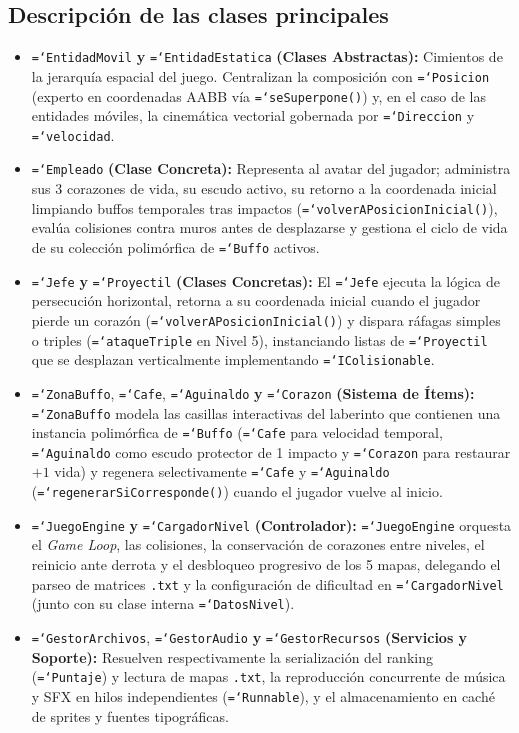 \documentclass[12pt, a4paper]{article}
\DeclareRobustCommand{\code}[1]{\textcolor{codegreen}{\texttt{\hyphenchar\font=`\-#1}}}
\begin{document}
\subsection{Descripción de las clases principales}
\begin{itemize}[leftmargin=1.27cm, before=]
    \item \code{EntidadMovil} \textbf{y} \code{EntidadEstatica} \textbf{(Clases Abstractas):} Cimientos de la jerarquía espacial del juego. Centralizan la composición con \code{Posicion} (experto en coordenadas AABB vía \code{seSuperpone()}) y, en el caso de las entidades móviles, la cinemática vectorial gobernada por \code{Direccion} y \code{velocidad}.
    \item \code{Empleado} \textbf{(Clase Concreta):} Representa al avatar del jugador; administra sus 3 corazones de vida, su escudo activo, su retorno a la coordenada inicial limpiando buffos temporales tras impactos (\code{volverAPosicionInicial()}), evalúa colisiones contra muros antes de desplazarse y gestiona el ciclo de vida de su colección polimórfica de \code{Buffo} activos.
    \item \code{Jefe} \textbf{y} \code{Proyectil} \textbf{(Clases Concretas):} El \code{Jefe} ejecuta la lógica de persecución horizontal, retorna a su coordenada inicial cuando el jugador pierde un corazón (\code{volverAPosicionInicial()}) y dispara ráfagas simples o triples (\code{ataqueTriple} en Nivel 5), instanciando listas de \code{Proyectil} que se desplazan verticalmente implementando \code{IColisionable}.
    \item \code{ZonaBuffo}, \code{Cafe}, \code{Aguinaldo} \textbf{y} \code{Corazon} \textbf{(Sistema de Ítems):} \code{ZonaBuffo} modela las casillas interactivas del laberinto que contienen una instancia polimórfica de \code{Buffo} (\code{Cafe} para velocidad temporal, \code{Aguinaldo} como escudo protector de 1 impacto y \code{Corazon} para restaurar $+1$ vida) y regenera selectivamente \code{Cafe} y \code{Aguinaldo} (\code{regenerarSiCorresponde()}) cuando el jugador vuelve al inicio.
    \item \code{JuegoEngine} \textbf{y} \code{CargadorNivel} \textbf{(Controlador):} \code{JuegoEngine} orquesta el \textit{Game Loop}, las colisiones, la conservación de corazones entre niveles, el reinicio ante derrota y el desbloqueo progresivo de los 5 mapas, delegando el parseo de matrices \texttt{.txt} y la configuración de dificultad en \code{CargadorNivel} (junto con su clase interna \code{DatosNivel}).
    \item \code{GestorArchivos}, \code{GestorAudio} \textbf{y} \code{GestorRecursos} \textbf{(Servicios y Soporte):} Resuelven respectivamente la serialización del ranking (\code{Puntaje}) y lectura de mapas \texttt{.txt}, la reproducción concurrente de música y SFX en hilos independientes (\code{Runnable}), y el almacenamiento en caché de sprites y fuentes tipográficas.

\end{itemize}
\end{document}
